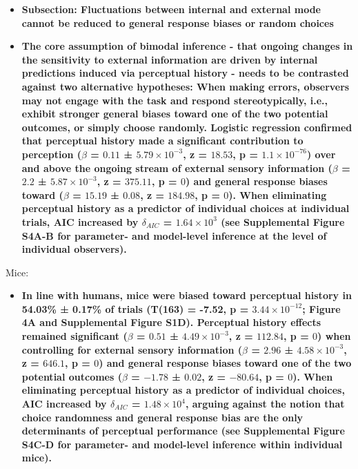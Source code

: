 \documentclass[
]{article}
\providecommand{\tightlist}{%
  \setlength{\itemsep}{0pt}\setlength{\parskip}{0pt}}
\begin{document}
\begin{itemize}
\item
  \textbf{Subsection: Fluctuations between internal and external mode
  cannot be reduced to general response biases or random choices}
\item
  \textbf{The core assumption of bimodal inference - that ongoing
  changes in the sensitivity to external information are driven by
  internal predictions induced via perceptual history - needs to be
  contrasted against two alternative hypotheses: When making errors,
  observers may not engage with the task and respond stereotypically,
  i.e., exhibit stronger general biases toward one of the two potential
  outcomes, or simply choose randomly. Logistic regression confirmed
  that perceptual history made a significant contribution to perception
  (\(\beta\) = \(0.11\) ± \(\ensuremath{5.79\times 10^{-3}}\), z =
  \(18.53\), p = \(\ensuremath{1.1\times 10^{-76}}\)) over and above the
  ongoing stream of external sensory information (\(\beta\) = \(2.2\) ±
  \(\ensuremath{5.87\times 10^{-3}}\), z = \(375.11\), p = \(0\)) and
  general response biases toward (\(\beta\) = \(15.19\) ± \(0.08\), z =
  \(184.98\), p = \(0\)). When eliminating perceptual history as a
  predictor of individual choices at individual trials, AIC increased by
  \(\delta_{AIC}\) = \ensuremath{1.64\times 10^{3}} (see Supplemental
  Figure S4A-B for parameter- and model-level inference at the level of
  individual observers).}
\end{itemize}

Mice:

\begin{itemize}
\tightlist
\item
  \textbf{In line with humans, mice were biased toward perceptual
  history in 54.03\% ± 0.17\% of trials (T(163) = -7.52, p =
  \(\ensuremath{3.44\times 10^{-12}}\); Figure 4A and Supplemental
  Figure S1D). Perceptual history effects remained significant
  (\(\beta\) = \(0.51\) ± \(\ensuremath{4.49\times 10^{-3}}\), z =
  \(112.84\), p = \(0\)) when controlling for external sensory
  information (\(\beta\) = \(2.96\) ±
  \(\ensuremath{4.58\times 10^{-3}}\), z = \(646.1\), p = \(0\)) and
  general response biases toward one of the two potential outcomes
  (\(\beta\) = \(-1.78\) ± \(0.02\), z = \(-80.64\), p = \(0\)). When
  eliminating perceptual history as a predictor of individual choices,
  AIC increased by \(\delta_{AIC}\) = \ensuremath{1.48\times 10^{4}},
  arguing against the notion that choice randomness and general response
  bias are the only determinants of perceptual performance (see
  Supplemental Figure S4C-D for parameter- and model-level inference
  within individual mice).}
\end{itemize}
\end{document}
